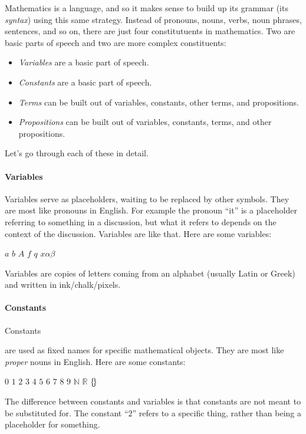\documentclass[12pt]{article}
\def\N{\mathbb{N}}
\def\R{\mathbb{R}}
\renewcommand{\emptyset}{\{\hspace{-2pt}\}}
\begin{document}
Mathematics is a language, and so it makes sense to build up its grammar (its \emph{syntax}) using this same strategy.
Instead of pronouns, nouns, verbs, noun phrases, sentences, and so on, there are just four constitutuents in
mathematics. Two are basic parts of speech and two are more complex constituents:
\begin{itemize}
\item \emph{Variables} are a basic part of speech.
\item \emph{Constants} are a basic part of speech.
\item \emph{Terms} can be built out of variables, constants, other terms, and propositions.
\item \emph{Propositions} can be built out of variables, constants, terms, and other propositions.
\end{itemize}

Let's go through each of these in detail.

\def\sp{\hspace{1em}}
\paragraph{Variables}
Variables serve as placeholders, waiting to be replaced by other symbols.
They are most like pronouns in English.
For example the pronoun ``it'' is a placeholder referring to something in a discussion, but what it refers to depends on the context of the discussion.
Variables are like that.
Here are some variables:
\begin{center}
$a$ \sp $b$ \sp $A$ \sp $f$ \sp $q$ \sp $x$\sp $\alpha$\sp $\beta$
\end{center}
Variables are copies of letters coming from an alphabet (usually Latin or Greek) and written in ink/chalk/pixels.



\def\sp{\hspace{1em}}
\paragraph{Constants}
\hypertarget{hl:constants}{Constants} are used as fixed names for specific mathematical objects.
They are most like \emph{proper} nouns in English.
Here are some constants:
\begin{center}
$0$ \sp $1$ \sp $2$ \sp $3$ \sp $4$ \sp $5$ \sp $6$ \sp $7$ \sp $8$ \sp $9$ \sp $\N$ \sp $\R$ \sp $\emptyset$
\end{center}
The difference between constants and variables is that constants are not meant to be substituted for.
The constant ``$2$'' refers to a specific thing, rather than being a placeholder for something.
\end{document}
